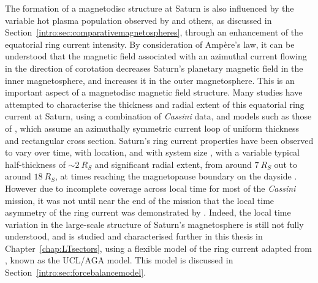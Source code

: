 The formation of a magnetodisc structure at Saturn is also influenced by the variable hot plasma population observed by \citet{sergis2010} and others, as discussed in Section~\ref{intro:sec:comparativemagnetospheres}, through an enhancement of the equatorial ring current intensity. By consideration of Amp\`ere's law, it can be understood that the magnetic field associated with an azimuthal current flowing in the direction of corotation decreases Saturn's planetary magnetic field in the inner magnetosphere, and increases it in the outer magnetosphere. This is an important aspect of a magnetodisc magnetic field structure. Many studies have attempted to characterise the thickness and radial extent of this equatorial ring current at Saturn, using a combination of \textit{Cassini} data, and models such as those of \citet{connerney1981b, connerney1983,bunce2007}, which assume an azimuthally symmetric current loop of uniform thickness and rectangular cross section. Saturn's ring current properties have been observed to vary over time, with location, and with system size \citep[e.g.][]{bunce2007}, with a variable typical half-thickness of ${\sim}\SI{2}{R_S}$ and significant radial extent, from around $\SI{7}{R_S}$ out to around $\SI{18}{R_S}$, at times reaching the magnetopause boundary on the dayside \citep[e.g.][]{kellett2009,sergis2009}. However due to incomplete coverage across local time for most of the \textit{Cassini} mission, it was not until near the end of the mission that the local time asymmetry of the ring current was demonstrated by \citet{sergis2017}. Indeed, the local time variation in the large-scale structure of Saturn's magnetosphere is still not fully understood, and is studied and characterised further in this thesis in Chapter~\ref{chap:LTsectors}, using a flexible model of the ring current adapted from \citet{achilleos2010a}, known as the UCL/AGA model. This model is discussed in Section~\ref{intro:sec:forcebalancemodel}.

